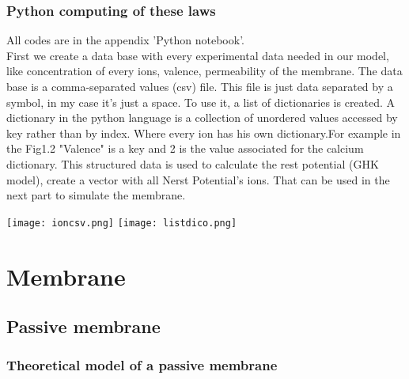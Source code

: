 \documentclass[a4paper,11pt]{report}
\begin{document}
 \subsection{Python computing of these laws}
 All codes are in the appendix 'Python notebook'.\\ 
 First we create a data base with every experimental data needed in our model, like concentration of every ions, valence, permeability of the membrane. The data base is a comma-separated values (csv) file. This file is just data separated by a symbol, in my case it's just a space. 
  To use it, a list of  dictionaries is created. A dictionary in the python language is a collection of unordered values accessed by key rather than by index. Where every ion has his own dictionary.For example in the Fig1.2 "Valence" is a key and 2 is the value associated for the calcium dictionary. This structured data is used to calculate the rest potential (GHK model), create a vector with all Nerst Potential's ions. That can be used in the next part to simulate the membrane. 
\begin{center}
\texttt{[image: ioncsv.png]} \hfill
\texttt{[image: listdico.png]}
\end{center}
\chapter{ Membrane }
  
 
 \section{Passive membrane}
 \subsection{Theoretical model of a passive membrane}
 
 
\end{document}
